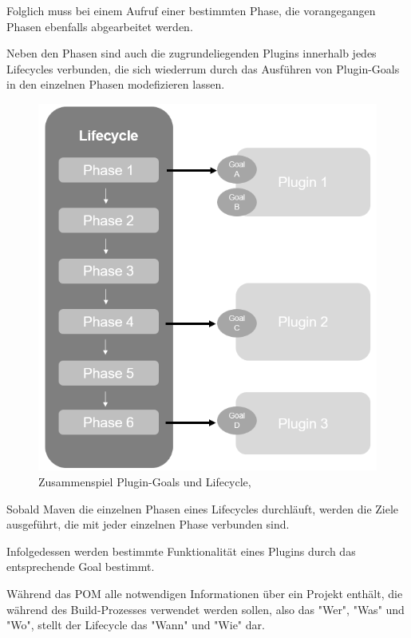 Folglich muss bei einem Aufruf einer bestimmten Phase, die vorangegangen Phasen ebenfalls abgearbeitet werden. 

Neben den Phasen sind auch die zugrundeliegenden Plugins innerhalb jedes Lifecycles verbunden, die sich wiederrum durch das Ausführen von Plugin-Goals in den einzelnen Phasen modefizieren lassen. \cite[S. 71]{spiller_maven_2011}

\begin{figure}[h]
    \centering
    \includegraphics[scale=0.5]{Bilder/lifecycle_maven.png}
    \caption{Zusammenspiel Plugin-Goals und Lifecycle, \cite[S. 59]{varanasi_introducing_2019}}
\end{figure}

Sobald Maven die einzelnen Phasen eines Lifecycles durchläuft, werden die Ziele ausgeführt, die mit jeder einzelnen Phase verbunden sind. \cite[S. 39]{loukides_maven_2008} 

Infolgedessen werden bestimmte Funktionalität eines Plugins durch das entsprechende Goal bestimmt. 

Während das POM alle notwendigen Informationen über ein Projekt enthält, die während des Build-Prozesses verwendet werden sollen, also das "Wer", "Was" und "Wo", stellt der Lifecycle das "Wann" und "Wie" dar. \cite{the_apache_software_foundation_maven_2002}

